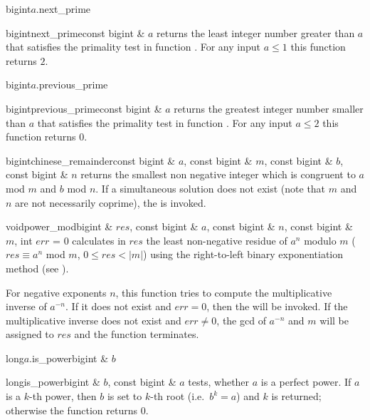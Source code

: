 \begin{cfcode}{bigint}{$a$.next_prime}{}\end{cfcode}
\begin{fcode}{bigint}{next_prime}{const bigint & $a$}
  returns the least integer number greater than $a$ that satisfies the primality test in
  function .  For any input $a \leq 1$ this function returns $2$.
\end{fcode}

\begin{cfcode}{bigint}{$a$.previous_prime}{}\end{cfcode}
\begin{fcode}{bigint}{previous_prime}{const bigint & $a$}
  returns the greatest integer number smaller than $ a$ that satisfies the primality test in
  function .  For any input $a \leq 2$ this function returns $0$.
\end{fcode}

\begin{fcode}{bigint}{chinese_remainder}{const bigint & $a$, const bigint & $m$,
    const bigint & $b$, const bigint & $n$}%
  returns the smallest non negative integer which is congruent to $a$ mod $m$ and $b$ mod $n$.
  If a simultaneous solution does not exist (note that $m$ and $n$ are not necessarily coprime),
  the \LEH is invoked.
\end{fcode}

\begin{fcode}{void}{power_mod}{bigint & $\mathit{res}$, const bigint & $a$, const bigint & $n$,
    const bigint & $m$, int $\mathit{err}$ = 0}%
  calculates in $\mathit{res}$ the least non-negative residue of $a^n$ modulo $m$ ($\mathit{res}
  \equiv a^n$ mod $m$, $0 \leq \mathit{res} < |m|$) using the right-to-left binary
  exponentiation method (see \cite[page 8]{Cohen:1995}).
  
  For negative exponents $n$, this function tries to compute the multiplicative inverse of
  $a^{-n}$.  If it does not exist and $\mathit{err} = 0$, then the \LEH will be invoked.  If the
  multiplicative inverse does not exist and $\mathit{err} \neq 0$, the gcd of $ a^{-n}$ and $m$
  will be assigned to $\mathit{res}$ and the function terminates.
\end{fcode}

\begin{cfcode}{long}{$a$.is_power}{bigint & $b$}\end{cfcode}
\begin{fcode}{long}{is_power}{bigint & $b$, const bigint & $a$}
  tests, whether $a$ is a perfect power.  If $a$ is a $k$-th power, then $b$ is set to $k$-th
  root (i.e.~$b^k=a$) and $k$ is returned; otherwise the function returns $0$.
\end{fcode}

